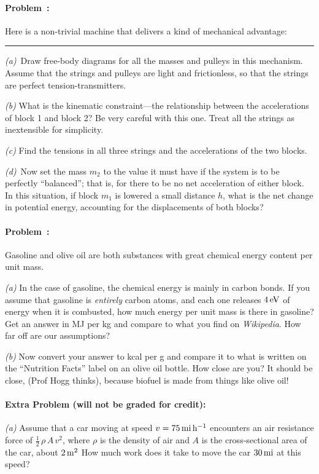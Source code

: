 \documentclass[12pt]{article}
\begin{document}
\paragraph{Problem~\theproblem:}%
Here is a non-trivial machine that delivers a kind of mechanical
advantage:
\\ \rule{0.33\textwidth}{0pt}

\textsl{(a)}~Draw free-body diagrams for all the masses and pulleys in
this mechanism. Assume that the strings and pulleys are light and
frictionless, so that the strings are perfect tension-transmitters.

\textsl{(b)} What is the kinematic constraint---the relationship
between the accelerations of block 1 and block 2? Be very careful with
this one. Treat all the strings as inextensible for simplicity.

\textsl{(c)} Find the tensions in all three strings and the
accelerations of the two blocks.

\textsl{(d)}~Now set the mass $m_2$ to the value it must have if the
system is to be perfectly ``balanced''; that is, for there to be no
net acceleration of either block.  In this situation, if block $m_1$
is lowered a small distance $h$, what is the net change in potential
energy, accounting for the displacements of both blocks?

\paragraph{Problem~\theproblem:}%
Gasoline and olive oil are both substances with great chemical energy
content per unit mass.

\textsl{(a)} In the case of gasoline, the chemical energy is mainly in
carbon bonds.  If you assume that gasoline is \emph{entirely} carbon
atoms, and each one releases $4\,\mathrm{eV}$ of energy when it is combusted, how
much energy per unit mass is there in gasoline?  Get an answer in MJ
per kg and compare to what you find on \textit{Wikipedia}.  How far off
are our assumptions?

\textsl{(b)} Now convert your answer to kcal per g and compare it to
what is written on the ``Nutrition Facts'' label on an olive oil
bottle.  How close are you?  It should be close, (Prof Hogg thinks), because
biofuel is made from things like olive oil!

\paragraph{Extra Problem (will not be graded for credit):}%
\textsl{(a)} Assume that a car moving at speed
$v=75\,\mathrm{mi}\,\mathrm{h}^{-1}$ encounters an air resistance force of
$\frac{1}{2}\,\rho\,A\,v^2$, where $\rho$ is the density of air and $A$ is the
cross-sectional area of the car, about $2\,\mathrm{m}^2$ How much work does it
take to move the car $30\,\mathrm{mi}$ at this speed?
\end{document}
